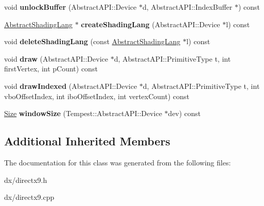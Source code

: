 \begin{DoxyCompactItemize}
\item 
\hypertarget{class_tempest_1_1_direct_x9_a8508f22beed18b9297b119f06c0fc61a}{void {\bfseries unlock\+Buffer} (Abstract\+A\+P\+I\+::\+Device $\ast$d, Abstract\+A\+P\+I\+::\+Index\+Buffer $\ast$) const }\label{class_tempest_1_1_direct_x9_a8508f22beed18b9297b119f06c0fc61a}

\item 
\hypertarget{class_tempest_1_1_direct_x9_ac6ac8fae24e46b4a49ed52e26bc5178f}{\hyperlink{class_tempest_1_1_abstract_shading_lang}{Abstract\+Shading\+Lang} $\ast$ {\bfseries create\+Shading\+Lang} (Abstract\+A\+P\+I\+::\+Device $\ast$l) const }\label{class_tempest_1_1_direct_x9_ac6ac8fae24e46b4a49ed52e26bc5178f}

\item 
\hypertarget{class_tempest_1_1_direct_x9_aa45b2bc4954968c401c320e2fae59559}{void {\bfseries delete\+Shading\+Lang} (const \hyperlink{class_tempest_1_1_abstract_shading_lang}{Abstract\+Shading\+Lang} $\ast$l) const }\label{class_tempest_1_1_direct_x9_aa45b2bc4954968c401c320e2fae59559}

\item 
\hypertarget{class_tempest_1_1_direct_x9_a7db742148155ca628afdc0b8bf52f7db}{void {\bfseries draw} (Abstract\+A\+P\+I\+::\+Device $\ast$d, Abstract\+A\+P\+I\+::\+Primitive\+Type t, int first\+Vertex, int p\+Count) const }\label{class_tempest_1_1_direct_x9_a7db742148155ca628afdc0b8bf52f7db}

\item 
\hypertarget{class_tempest_1_1_direct_x9_a133bfc2af91d5c56e853054e5f63ab50}{void {\bfseries draw\+Indexed} (Abstract\+A\+P\+I\+::\+Device $\ast$d, Abstract\+A\+P\+I\+::\+Primitive\+Type t, int vbo\+Offset\+Index, int ibo\+Offset\+Index, int vertex\+Count) const }\label{class_tempest_1_1_direct_x9_a133bfc2af91d5c56e853054e5f63ab50}

\item 
\hypertarget{class_tempest_1_1_direct_x9_a0ca3f3eb56b614533a81800f21facf82}{\hyperlink{struct_tempest_1_1_size}{Size} {\bfseries window\+Size} (Tempest\+::\+Abstract\+A\+P\+I\+::\+Device $\ast$dev) const }\label{class_tempest_1_1_direct_x9_a0ca3f3eb56b614533a81800f21facf82}

\end{DoxyCompactItemize}
\subsection*{Additional Inherited Members}


The documentation for this class was generated from the following files\+:\begin{DoxyCompactItemize}
\item 
dx/directx9.\+h\item 
dx/directx9.\+cpp\end{DoxyCompactItemize}
